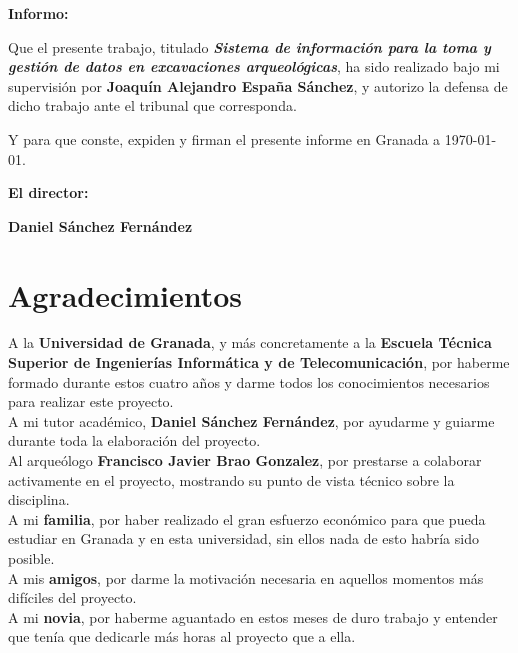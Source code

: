 \vspace{0.5cm}

\textbf{Informo:}

\vspace{0.5cm}

Que el presente trabajo, titulado \textit{\textbf{Sistema de información para la toma y
gestión de datos en excavaciones arqueológicas}}, ha sido realizado bajo mi supervisión por
\textbf{Joaquín Alejandro España Sánchez}, y autorizo la defensa de dicho trabajo ante el
tribunal que corresponda.

\vspace{0.5cm}

Y para que conste, expiden y firman el presente informe en Granada a \today.

\vspace{1cm}

\textbf{El director:}

\vspace{5cm}

\noindent \textbf{Daniel Sánchez Fernández}

\chapter*{Agradecimientos}

A la \textbf{Universidad de Granada}, y más concretamente a la \textbf{Escuela
Técnica Superior de Ingenierías Informática y de Telecomunicación}, por haberme formado
durante estos cuatro años y darme todos los conocimientos necesarios para realizar este
proyecto. \\

A mi tutor académico, \textbf{Daniel Sánchez Fernández}, por ayudarme y guiarme durante
toda la elaboración del proyecto. \\

Al arqueólogo \textbf{Francisco Javier Brao Gonzalez}, por prestarse a colaborar
activamente en el proyecto, mostrando su punto de vista técnico sobre la disciplina. \\

A mi \textbf{familia}, por haber realizado el gran esfuerzo económico para que pueda
estudiar en Granada y en esta universidad, sin ellos nada de esto habría sido posible. \\

A mis \textbf{amigos}, por darme la motivación necesaria en aquellos momentos más
difíciles del proyecto. \\

A mi \textbf{novia}, por haberme aguantado en estos meses de duro trabajo y entender
que tenía que dedicarle más horas al proyecto que a ella. \\
